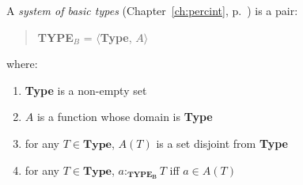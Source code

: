 A {\it system of basic types\/} (Chapter~\ref{ch:percint}, p.~\pageref{ex:def-basic-types}) is a pair:
\begin{quote}
{\bf TYPE$_B$} = $\langle${\bf Type}, $A$$\rangle$
\end{quote}
where:
\begin{enumerate} 
 
\item \textbf{Type} is a non-empty set 
 
\item $A$ is a function whose domain is \textbf{Type}

\item for any $T\in\textbf{Type}$, $A(T)$ is a set disjoint from
  \textbf{Type}

\item for any $T\in\textbf{Type}$, $a:_{\mathbf{TYPE_B}}T$ iff $a\in A(T)$
 
\end{enumerate}


 
 
 


 
  
